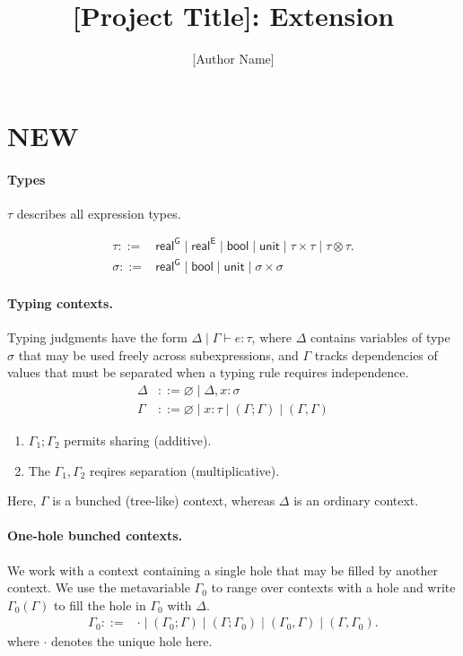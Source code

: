 \documentclass[manuscript,review,nonacm]{acmart}
\title{[Project Title]: Extension}
\author{[Author Name]}
\affiliation{%
  \institution{[Institution]}
  \city{[City]}
  \country{[Country]}}
\newcommand{\G}{\mathsf{G}}
\newcommand{\E}{\mathsf{E}}
\newcommand{\real}[1]{\mathsf{real}^{#1}}
\begin{document}
\maketitle

\section{NEW}
\paragraph{Types}
$\tau$ describes all expression types.

\begin{align*}
\tau ::= {}&
\real{\G} \mid \real{\E}
\mid \mathsf{bool}
\mid \mathsf{unit}
\mid \tau \times \tau
\mid \tau \otimes \tau.\\
\sigma ::= {}&
\real{\G} \mid \mathsf{bool} \mid \mathsf{unit}
\mid \sigma \times \sigma
\end{align*}

\paragraph{Typing contexts.}
Typing judgments have the form $\Delta \mid \Gamma \vdash e : \tau$, where $\Delta$ contains variables of type $\sigma$ that may be used freely across subexpressions, and $\Gamma$ tracks dependencies of values that must be separated when a typing rule requires independence.
\begin{align*}
\Delta &::= \varnothing \mid \Delta,x:\sigma \\
\Gamma &::= \varnothing
  \mid x:\tau
  \mid (\Gamma;\Gamma)
  \mid (\Gamma,\Gamma)
\end{align*}

\begin{enumerate}
  \item $\Gamma_1 ; \Gamma_2$ permits sharing (additive).
  \item The $\Gamma_1 , \Gamma_2$ reqires separation (multiplicative).
\end{enumerate}

Here, $\Gamma$ is a bunched (tree-like) context, whereas $\Delta$ is an ordinary context.

\paragraph{One-hole bunched contexts.}
We work with a context containing a single hole that may be filled by another context. We use the metavariable $\Gamma_0$ to range over contexts with a hole and write $\Gamma_0(\Gamma)$ to fill the hole in $\Gamma_0$ with $\Delta$.
\begin{align*}
\Gamma_0 ::= {}&
\cdot
\mid (\Gamma_0;\Gamma)
\mid (\Gamma;\Gamma_0)
\mid (\Gamma_0,\Gamma)
\mid (\Gamma,\Gamma_0).
\end{align*}
where $\cdot$ denotes the unique hole here.
\end{document}
